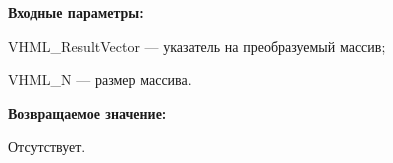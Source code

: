 \textbf{Входные параметры:}
 
VHML\_ResultVector --- указатель на преобразуемый массив;
 
VHML\_N --- размер массива.

\textbf{Возвращаемое значение:}

Отсутствует.